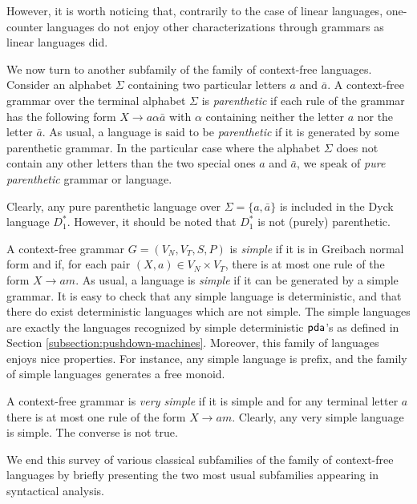 However, it is worth noticing that, contrarily to the case of linear languages, one-counter languages do not enjoy other characterizations through grammars as linear languages did.

We now turn to another subfamily of the family of context-free languages. Consider an alphabet $\Sigma$ containing two particular letters $a$ and $\bar{a}$. A context-free grammar over the terminal alphabet $\Sigma$ is \emph{parenthetic} if each rule of the grammar has the following form $X \to a \alpha \bar{a}$ with $\alpha$ containing neither the letter $a$ nor the letter $\bar{a}$. As usual, a language is said to be \emph{parenthetic} if it is generated by some parenthetic grammar. In the particular case where the alphabet $\Sigma$ does not contain any other letters than the two special ones $a$ and $\bar{a}$, we speak of \emph{pure parenthetic} grammar or language.

Clearly, any pure parenthetic language over $\Sigma = \{a, \bar{a}\}$ is included in the Dyck language $D_1^*$. However, it should be noted that $D_1^*$ is not (purely) parenthetic.

A context-free grammar $G = (V_N, V_T, S, P)$ is  \emph{simple} if it is in  Greibach normal form and if, for each pair $(X, a) \in V_N \times V_T$, there is at most one rule of the form $X \to am$. As usual, a language is \emph{simple} if it can be generated by a simple grammar. It is easy to check that any simple language is deterministic, and that there do exist deterministic languages which are not simple. The simple languages are exactly the languages recognized by  simple deterministic \index{$\pda$}$\pda$'s as defined in Section \ref{subsection:pushdown-machines}. Moreover, this family of languages enjoys nice properties. For instance, any simple language is prefix, and the family of simple languages generates a free monoid.

A context-free grammar is \emph{very simple} if it is simple and for any terminal letter $a$ there is at most one rule of the form $X \to am$. Clearly, any very simple language is simple. The converse is not true.

We end this survey of various classical subfamilies of the family of context-free languages by briefly presenting the two most usual subfamilies appearing in syntactical analysis.


